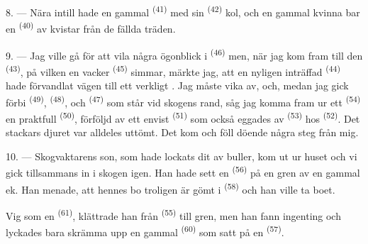 8. --- Nära intill hade en gammal  \textsuperscript{(41)} med sin
 \textsuperscript{(42)} kol, och en gammal
kvinna bar en  \textsuperscript{(40)}  av kvistar från de
fällda träden.

\VUsaut{3.0mm}
\VUsaut{3.0mm}

9. --- Jag ville gå för att vila några ögonblick i 
\textsuperscript{(46)} men, när jag kom fram till den 
\textsuperscript{(43)}, på vilken en vacker  \textsuperscript{(45)} simmar,
märkte jag, att en nyligen inträffad  \textsuperscript{(44)} hade
förvandlat vägen till ett verkligt . Jag måste vika av, och, medan jag gick
förbi  \textsuperscript{(49)},  \textsuperscript{(48)}, och
 \textsuperscript{(47)} som står vid skogens rand, såg jag komma
fram ur ett  \textsuperscript{(54)} en praktfull 
\textsuperscript{(50)}, förföljd av ett envist  \textsuperscript{(51)} som
också eggades av  \textsuperscript{(53)} hos 
\textsuperscript{(52)}. Det stackars djuret var alldeles uttömt. Det kom och föll döende några
steg från mig.

10. --- Skogvaktarens son, som hade lockats dit av  buller, kom ut ur
huset och vi gick tillsammans in i skogen igen. Han hade sett en
 \textsuperscript{(56)} på en gren av en gammal ek. Han menade, att
hennes bo troligen är gömt i  \textsuperscript{(58)} och han ville ta boet.

Vig som en  \textsuperscript{(61)}, klättrade han från
 \textsuperscript{(55)} till gren, men han fann ingenting och lyckades
bara skrämma upp en gammal  \textsuperscript{(60)} som satt på en
 \textsuperscript{(57)}.
\VUsaut{4.0mm}
\VUfilet{22mm}
